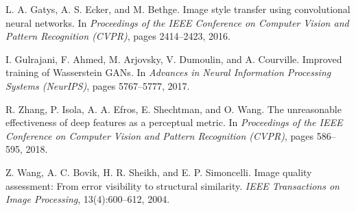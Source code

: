 \documentclass[10pt,twocolumn,letterpaper]{article}
\begin{document}
\begin{thebibliography}{10}
L. A. Gatys, A. S. Ecker, and M. Bethge.
Image style transfer using convolutional neural networks.
In \textit{Proceedings of the IEEE Conference on Computer Vision and Pattern Recognition (CVPR)}, pages 2414–2423, 2016.

I. Gulrajani, F. Ahmed, M. Arjovsky, V. Dumoulin, and A. Courville.
Improved training of Wasserstein GANs.
In \textit{Advances in Neural Information Processing Systems (NeurIPS)}, pages 5767–5777, 2017.

R. Zhang, P. Isola, A. A. Efros, E. Shechtman, and O. Wang.
The unreasonable effectiveness of deep features as a perceptual metric.
In \textit{Proceedings of the IEEE Conference on Computer Vision and Pattern Recognition (CVPR)}, pages 586–595, 2018.

Z. Wang, A. C. Bovik, H. R. Sheikh, and E. P. Simoncelli.
Image quality assessment: From error visibility to structural similarity.
\textit{IEEE Transactions on Image Processing}, 13(4):600–612, 2004.


\end{thebibliography}
\end{document}
